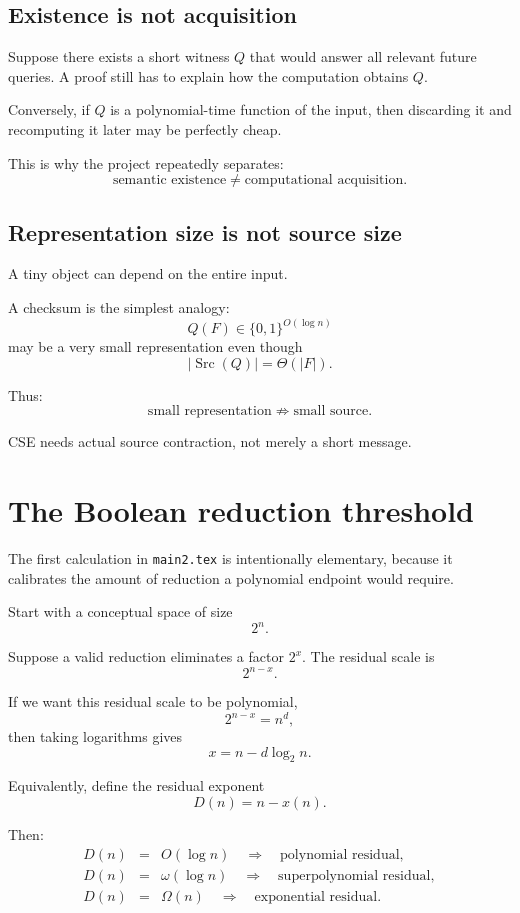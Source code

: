 \documentclass[11pt]{article}
\theoremstyle{plain}
\theoremstyle{definition}
\theoremstyle{remark}
\begin{document}
\subsection{Existence is not acquisition}

Suppose there exists a short witness \(Q\) that would answer all relevant
future queries.  A proof still has to explain how the computation obtains
\(Q\).

Conversely, if \(Q\) is a polynomial-time function of the input, then
discarding it and recomputing it later may be perfectly cheap.

This is why the project repeatedly separates:
\[
\boxed{\text{semantic existence}\ne\text{computational acquisition}.}
\]

\subsection{Representation size is not source size}

A tiny object can depend on the entire input.

A checksum is the simplest analogy:
\[
Q(F)\in\{0,1\}^{O(\log n)}
\]
may be a very small representation even though
\[
|\operatorname{Src}(Q)|=\Theta(|F|).
\]

Thus:
\[
\boxed{\text{small representation}\not\Rightarrow\text{small source}.}
\]

CSE needs actual source contraction, not merely a short message.

\section{The Boolean reduction threshold}

The first calculation in \texttt{main2.tex} is intentionally elementary,
because it calibrates the amount of reduction a polynomial endpoint would
require.

Start with a conceptual space of size
\[
2^n.
\]

Suppose a valid reduction eliminates a factor \(2^x\).  The residual scale is
\[
2^{n-x}.
\]

If we want this residual scale to be polynomial,
\[
2^{n-x}=n^d,
\]
then taking logarithms gives
\[
\boxed{x=n-d\log_2 n.}
\]

Equivalently, define the residual exponent
\[
D(n)=n-x(n).
\]

Then:
\[
\boxed{
\begin{array}{rcl}
D(n)&=&O(\log n)\quad\Rightarrow\quad\text{polynomial residual},\\[0.3em]
D(n)&=&\omega(\log n)\quad\Rightarrow\quad\text{superpolynomial residual},\\[0.3em]
D(n)&=&\Omega(n)\quad\Rightarrow\quad\text{exponential residual}.
\end{array}}
\]
\end{document}
